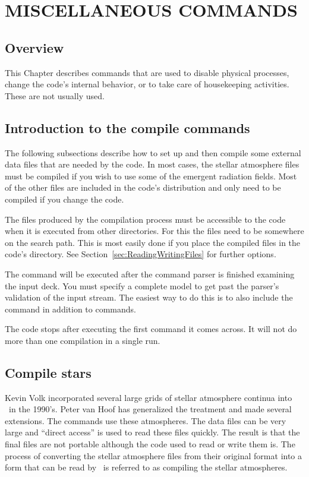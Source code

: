 \chapter{MISCELLANEOUS COMMANDS}
\label{sec:MiscellaneousCommands}

\section{Overview}

This Chapter describes commands that are used to disable physical
processes, change the code's internal behavior, or to take care of
housekeeping activities.
These are not usually used.

\section{Introduction to the compile commands}

The following subsections describe how to set up and then compile some
external data files that are needed by the code.
In most cases, the stellar atmosphere
files must be compiled if you wish to use some of the
 emergent radiation fields.
Most of the other files are included in the code's distribution and only
need to be compiled if you change the code.

The files produced by the compilation process must be accessible to the
code when it is executed from other directories.
For this the files need to be somewhere on the search path.
This is most easily done
if you place the compiled files in
the code's  directory.
See Section~\ref{sec:ReadingWritingFiles} for further options.

The  command will be executed after
the command parser is finished
examining the input deck.
You must specify a complete model to get past
the parser's validation of the input stream.
The easiest way to do this
is to also include the  command
in addition to
 commands.

The code stops after executing the first 
command it comes across.
It will not do more than one compilation in a single run.

\section{Compile stars}

Kevin Volk incorporated several large grids of stellar atmosphere
continua
into \Cloudy\ in the 1990's.
Peter van Hoof has generalized the treatment
and made several extensions.
The  commands use these atmospheres.
The data files can be very large and ``direct access'' is used to read these
files quickly.
The result is that the final files are not portable although
the code used to read or write them is.
The process of converting the
stellar atmosphere files from their original format into a form that can
be read by \Cloudy\ is referred to as compiling the stellar atmospheres.

